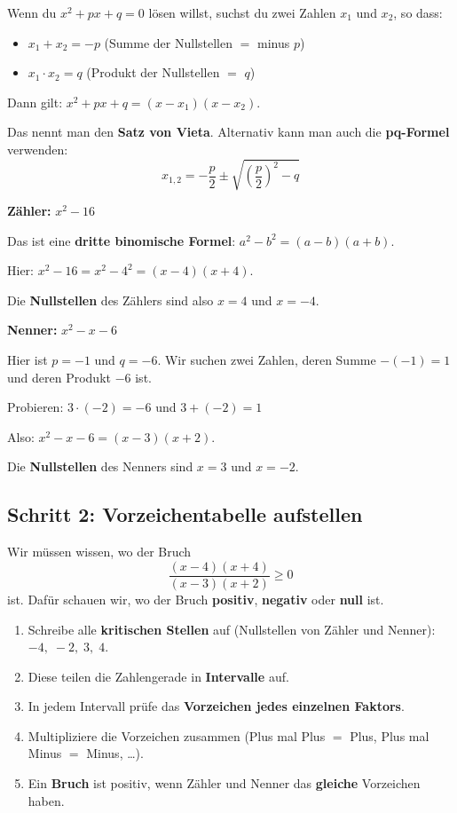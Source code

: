 \documentclass[12pt,a4paper]{article}
\begin{document}
\begin{merkbox}[title={Faktorisieren -- Wie geht das?}]
Wenn du $x^2 + px + q = 0$ l\"osen willst, suchst du zwei Zahlen $x_1$ und $x_2$, so dass:
\begin{itemize}
  \item $x_1 + x_2 = -p$ \quad (Summe der Nullstellen $=$ minus $p$)
  \item $x_1 \cdot x_2 = q$ \quad (Produkt der Nullstellen $=$ $q$)
\end{itemize}
Dann gilt: $x^2 + px + q = (x - x_1)(x - x_2)$.

Das nennt man den \textbf{Satz von Vieta}. Alternativ kann man auch die \textbf{pq-Formel} verwenden:
\[
  x_{1,2} = -\frac{p}{2} \pm \sqrt{\left(\frac{p}{2}\right)^2 - q}
\]
\end{merkbox}

\textbf{Z\"ahler:} $x^2 - 16$

Das ist eine \textbf{dritte binomische Formel}: $a^2 - b^2 = (a-b)(a+b)$.

Hier: $x^2 - 16 = x^2 - 4^2 = (x-4)(x+4)$.

Die \textbf{Nullstellen} des Z\"ahlers sind also $x = 4$ und $x = -4$.

\bigskip

\textbf{Nenner:} $x^2 - x - 6$

Hier ist $p = -1$ und $q = -6$. Wir suchen zwei Zahlen, deren Summe $-(-1)=1$ und deren Produkt $-6$ ist.

Probieren: $3 \cdot (-2) = -6$ und $3 + (-2) = 1$ \checkmark

Also: $x^2 - x - 6 = (x - 3)(x + 2)$.

Die \textbf{Nullstellen} des Nenners sind $x = 3$ und $x = -2$.

\subsection{Schritt 2: Vorzeichentabelle aufstellen}

Wir m\"ussen wissen, wo der Bruch
\[
  \frac{(x-4)(x+4)}{(x-3)(x+2)} \ge 0
\]
ist. Daf\"ur schauen wir, wo der Bruch \textbf{positiv}, \textbf{negativ} oder \textbf{null} ist.

\begin{merkbox}[title={Wie funktioniert eine Vorzeichentabelle?}]
\begin{enumerate}
  \item Schreibe alle \textbf{kritischen Stellen} auf (Nullstellen von Z\"ahler und Nenner): $-4,\;-2,\;3,\;4$.
  \item Diese teilen die Zahlengerade in \textbf{Intervalle} auf.
  \item In jedem Intervall pr\"ufe das \textbf{Vorzeichen jedes einzelnen Faktors}.
  \item Multipliziere die Vorzeichen zusammen (Plus mal Plus $=$ Plus, Plus mal Minus $=$ Minus, \dots).
  \item Ein \textbf{Bruch} ist positiv, wenn Z\"ahler und Nenner das \textbf{gleiche} Vorzeichen haben.
\end{enumerate}
\end{merkbox}
\end{document}
